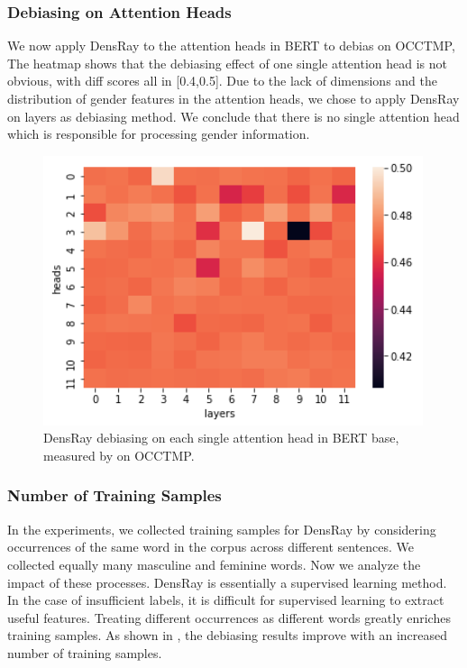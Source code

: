 \subsubsection{Debiasing on Attention Heads}
We now apply DensRay to the attention heads in BERT to
debias on OCCTMP, The heatmap  shows that
the debiasing effect of one single attention head is not
obvious, with diff scores all in [0.4,0.5]. Due to the
lack of dimensions and the distribution of gender features
in the attention heads, we chose to apply DensRay on layers
as debiasing method.  We conclude that there is no single
attention head which is responsible for processing gender
information.
\begin{figure}[h]
	\centering
	\includegraphics[width=0.5\linewidth]{heatmap_heads}
	\caption{DensRay debiasing on each single attention head in BERT base, measured by  on OCCTMP.}
\end{figure}


\subsubsection{Number of Training Samples}
In the experiments, we collected training samples for
DensRay by considering occurrences of the same word in the
corpus across different sentences. We collected equally many
masculine and feminine words. Now we analyze the impact of
these processes.  DensRay is essentially a supervised
learning method. In the case of insufficient labels, it is
difficult for supervised learning to extract useful
features. Treating different occurrences as different words
greatly enriches training samples. As shown in
, the debiasing results improve with an
increased number of training samples.

